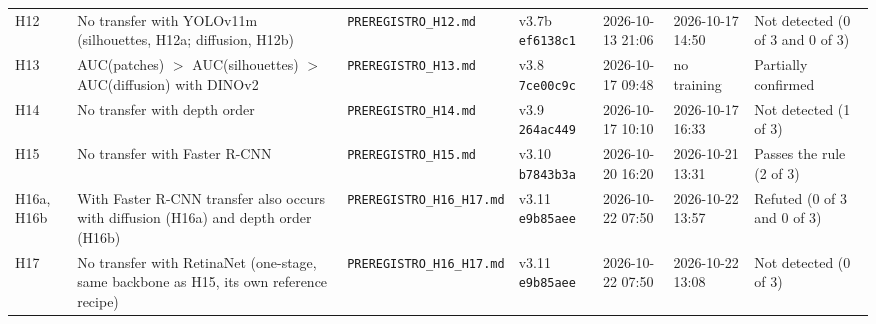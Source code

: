 \begin{table}[H]
{\begin{tabular}{@{}l p{6.3cm} l l l l p{3.2cm}@{}}
H12 & No transfer with YOLOv11m (silhouettes, H12a; diffusion, H12b) & \texttt{PREREGISTRO\_H12.md} & v3.7b \texttt{ef6138c1} & 2026-10-13 21:06 & 2026-10-17 14:50 & Not detected (0 of 3 and 0 of 3) \\
H13 & AUC(patches) $>$ AUC(silhouettes) $>$ AUC(diffusion) with DINOv2 & \texttt{PREREGISTRO\_H13.md} & v3.8 \texttt{7ce00c9c} & 2026-10-17 09:48 & no training & Partially confirmed \\
H14 & No transfer with depth order & \texttt{PREREGISTRO\_H14.md} & v3.9 \texttt{264ac449} & 2026-10-17 10:10 & 2026-10-17 16:33 & Not detected (1 of 3) \\
H15 & No transfer with Faster R-CNN & \texttt{PREREGISTRO\_H15.md} & v3.10 \texttt{b7843b3a} & 2026-10-20 16:20 & 2026-10-21 13:31 & Passes the rule (2 of 3) \\
H16a, H16b & With Faster R-CNN transfer also occurs with diffusion (H16a) and depth order (H16b) & \texttt{PREREGISTRO\_H16\_H17.md} & v3.11 \texttt{e9b85aee} & 2026-10-22 07:50 & 2026-10-22 13:57 & Refuted (0 of 3 and 0 of 3) \\
H17 & No transfer with RetinaNet (one-stage, same backbone as H15, its own reference recipe) & \texttt{PREREGISTRO\_H16\_H17.md} & v3.11 \texttt{e9b85aee} & 2026-10-22 07:50 & 2026-10-22 13:08 & Not detected (0 of 3) \\
\bottomrule\end{tabular}}\end{table}
